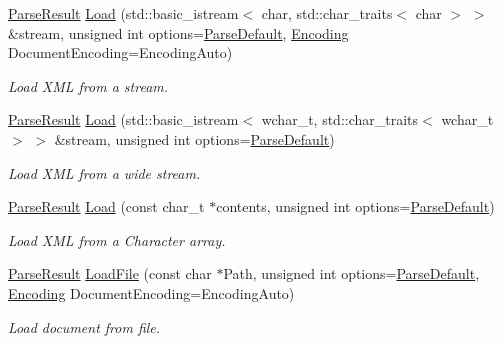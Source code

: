 \begin{DoxyCompactItemize}
\item 
\hyperlink{structphys_1_1xml_1_1ParseResult}{ParseResult} \hyperlink{classphys_1_1xml_1_1Document_a9d4ddfd3b987fa3d31d41c06d06a001e}{Load} (std::basic\_\-istream$<$ char, std::char\_\-traits$<$ char $>$ $>$ \&stream, unsigned int options=\hyperlink{namespacephys_1_1xml_aa6b8f7f8c2322fd683a235b498834d60}{ParseDefault}, \hyperlink{namespacephys_1_1xml_a420f5de782438f88160321385bea2015}{Encoding} DocumentEncoding=EncodingAuto)
\begin{DoxyCompactList}\small\item\em Load XML from a stream. \item\end{DoxyCompactList}\item 
\hyperlink{structphys_1_1xml_1_1ParseResult}{ParseResult} \hyperlink{classphys_1_1xml_1_1Document_a5c31cda427eeeb61cd40932f7bec6376}{Load} (std::basic\_\-istream$<$ wchar\_\-t, std::char\_\-traits$<$ wchar\_\-t $>$ $>$ \&stream, unsigned int options=\hyperlink{namespacephys_1_1xml_aa6b8f7f8c2322fd683a235b498834d60}{ParseDefault})
\begin{DoxyCompactList}\small\item\em Load XML from a wide stream. \item\end{DoxyCompactList}\item 
\hyperlink{structphys_1_1xml_1_1ParseResult}{ParseResult} \hyperlink{classphys_1_1xml_1_1Document_a7ae98719610eefc5c05255e305c75e56}{Load} (const char\_\-t $\ast$contents, unsigned int options=\hyperlink{namespacephys_1_1xml_aa6b8f7f8c2322fd683a235b498834d60}{ParseDefault})
\begin{DoxyCompactList}\small\item\em Load XML from a Character array. \item\end{DoxyCompactList}\item 
\hyperlink{structphys_1_1xml_1_1ParseResult}{ParseResult} \hyperlink{classphys_1_1xml_1_1Document_a2e832250addde2f928b8ef659dd7d50c}{LoadFile} (const char $\ast$Path, unsigned int options=\hyperlink{namespacephys_1_1xml_aa6b8f7f8c2322fd683a235b498834d60}{ParseDefault}, \hyperlink{namespacephys_1_1xml_a420f5de782438f88160321385bea2015}{Encoding} DocumentEncoding=EncodingAuto)
\begin{DoxyCompactList}\small\item\em Load document from file. \item\end{DoxyCompactList}\item 

\end{DoxyCompactItemize}
